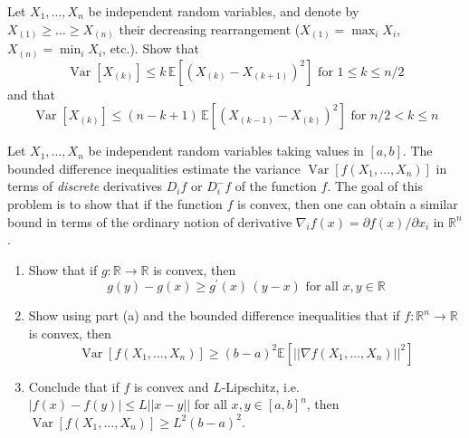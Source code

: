 \documentclass{article}
\DeclareMathOperator{\Var}{Var}
\begin{document}
  \begin{exercise}
  Let $X_1, \ldots, X_n$ be independent random variables, and denote by $X_{(1)} \geq \ldots \geq X_{(n)}$ their decreasing rearrangement ($X_{(1)} = \max_i X_i$, $X_{(n)} = \min_i X_i$, etc.). Show that 
  \[\Var[X_{(k)}] \leq k \, \mathbb{E}[(X_{(k)} - X_{(k+1)})^2] \text{ for } 1 \leq k \leq n/2\]
  and that 
  \[\Var[X_{(k)}] \leq (n - k + 1)\, \mathbb{E}[(X_{(k-1)} - X_{(k)})^2] \text{ for } n/2 < k \leq n\]
  \end{exercise}

  \begin{exercise}
  Let $X_1, \ldots, X_n$ be independent random variables taking values in $[a, b]$. The bounded difference inequalities estimate the variance $\Var[f(X_1, \ldots, X_n)]$ in terms of \textit{discrete} derivatives $D_i f$ or $D_i^- f$ of the function $f$. The goal of this problem is to show that if the function $f$ is convex, then one can obtain a similar bound in terms of the ordinary notion of derivative $\nabla_i f(x) = \partial f(x)/\partial x_i$ in $\mathbb{R}^n$. 
  \begin{enumerate}
      \item Show that if $g: \mathbb{R} \longrightarrow \mathbb{R}$ is convex, then 
      \[g(y) - g(x) \geq g^\prime (x)\, (y - x) \text{ for all } x, y \in \mathbb{R}\]
      
      \item Show using part (a) and the bounded difference inequalities that if $f: \mathbb{R}^n \rightarrow \mathbb{R}$ is convex, then 
      \[\Var[f(X_1, \ldots, X_n)] \geq (b - a)^2 \mathbb{E}[ ||\nabla f (X_1, \ldots, X_n)||^2]\]
      
      \item Conclude that if $f$ is convex and $L$-Lipschitz, i.e. $|f(x) - f(y)| \leq L ||x - y||$ for all $x, y \in [a, b]^n$, then $\Var[f(X_1, \ldots, X_n)] \geq L^2 (b - a)^2$. 
  \end{enumerate}
  \end{exercise}
\end{document}
